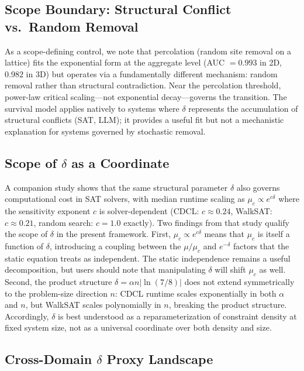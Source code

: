 \documentclass[11pt,a4paper]{article}
\begin{document}
\subsection{Scope Boundary: Structural Conflict vs.\ Random Removal}

As a scope-defining control, we note that percolation (random site removal on a lattice) fits the exponential form at the aggregate level (AUC $= 0.993$ in 2D, $0.982$ in 3D) but operates via a fundamentally different mechanism: random removal rather than structural contradiction. Near the percolation threshold, power-law critical scaling---not exponential decay---governs the transition. The survival model applies natively to systems where $\delta$ represents the accumulation of structural conflicts (SAT, LLM); it provides a useful fit but not a mechanistic explanation for systems governed by stochastic removal.

\subsection{Scope of \texorpdfstring{$\delta$}{δ} as a Coordinate}
\label{sec:delta-scope}

A companion study \citep{sunagawa2026sat} shows that the same structural parameter $\delta$ also governs computational cost in SAT solvers, with median runtime scaling as $\mu_c \propto e^{c\delta}$ where the sensitivity exponent $c$ is solver-dependent (CDCL: $c \approx 0.24$, WalkSAT: $c \approx 0.21$, random search: $c = 1.0$ exactly). Two findings from that study qualify the scope of $\delta$ in the present framework. First, $\mu_c \propto e^{c\delta}$ means that $\mu_c$ is itself a function of $\delta$, introducing a coupling between the $\mu/\mu_c$ and $e^{-\delta}$ factors that the static equation treats as independent. The static independence remains a useful decomposition, but users should note that manipulating $\delta$ will shift $\mu_c$ as well. Second, the product structure $\delta = \alpha n |\ln(7/8)|$ does not extend symmetrically to the problem-size direction $n$: CDCL runtime scales exponentially in both $\alpha$ and $n$, but WalkSAT scales polynomially in $n$, breaking the product structure. Accordingly, $\delta$ is best understood as a reparameterization of constraint density at fixed system size, not as a universal coordinate over both density and size.

\subsection{Cross-Domain \texorpdfstring{$\delta$}{δ} Proxy Landscape}
\end{document}
